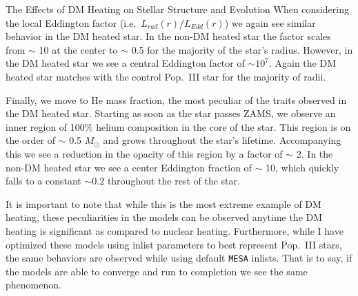 \documentclass[a4paper,11pt]{article}
\begin{document}
\begin{section}{The Effects of DM Heating on Stellar Structure and Evolution}
    When considering the local Eddington factor (i.e.~$L_{rad}(r)/L_{Edd}(r)$) we again see similar behavior in the DM heated star.
    In the non-DM heated star the factor scales from $\sim$ 10 at the center to $\sim$ 0.5 for the majority of the star's radius.
    However, in the DM heated star we see a central Eddington factor of $\sim 10^7$. Again the DM heated star matches with the control Pop.~III star for the majority of radii.

    Finally, we move to He mass fraction, the most peculiar of the traits observed in the DM heated star.
    Starting as soon as the star passes ZAMS, we observe an inner region of 100\% helium composition in the core of the star.
    This region is on the order of $\sim$ 0.5 $M_\odot$ and grows throughout the star's lifetime.
    Accompanying this we see a reduction in the opacity of this region by a factor of $\sim$ 2.
    In the non-DM heated star we see a center Eddington fraction of $\sim$ 10, which quickly falls to a constant $\sim 0.2$ throughout the rest of the star.

    It is important to note that while this is the most extreme example of DM heating, these peculiarities in the models can be observed anytime the DM heating is significant as compared to nuclear heating.
    Furthermore, while I have optimized these models using inlist parameters to best represent Pop.~III stars, the same behaviors are observed while using default \texttt{MESA} inlists.
    That is to say, if the models are able to converge and run to completion we see the same phenomenon.
\end{section}
\end{document}
